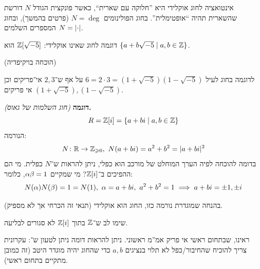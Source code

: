 \documentclass[name=רשימות אלגברה לינארית 2א]{../../../tex/classes/megasumPreamble}
\begin{document}
	אינטואציה לחוג אוקלידי היא ''חלוקה עם שארית``, כאשר פונקצית הגודל $N$ דורשת שהשארית תהיה ``אופטימלית''. בחוג הפולינומים $N = \deg$ (פרטים בהמשך), ובחוג המספרים השלמים $N = \left \lvert \cdot \right \rvert$. 
	
	דוגמה לחוג שאינו אוקלידי: $\mathbb{Z}[\sqrt{-5}]$ הוא $\{a + b\sqrt{-5} \mid a, b \in \mathbb{Z}\}$. 
	
	(הוכחה בויקיפדיה)
	
	לדוגמה בחוג לעיל $6 = 2 \cdot 3 = (1 + \sqrt{-5})(1 - \sqrt{-5})$ על אף ש־$2, 3$ אי־פריקים וכן $(1 + \sqrt{-5}), (1  - \sqrt{-5})$ אי פריקים. 
	
	
	\textbf{דוגמה }\textit{(חוג השלמות של גאוס)}\textbf{. }
	\[ R = \mathbb{Z}[i] = \{a + bi \mid a, b \in \mathbb{Z}\} \]
	הנורמה: 
	\[ N \colon \mathbb{R}\to \mathbb{Z}_{\geqslant 0}, \ N(a + bi) = a^2 + b^2 = |a + bi|^2 \]
	בדומה להוכחה לפיה הערך המוחלט של מורכב הוא כפלי, ניתן להראות ש־$N$ כפלית. מי הם ההפיכים ב־$\mathbb{Z}[i]$? מי שמקיים $\alpha \beta = 1$, כלומר: 
	\[ N(\alpha)N(\beta) = 1 = N(1), \ \alpha = a + bi, \ a^2 + b^2 = 1 \implies a + bi = \pm 1, \pm i \]
	
	בהנחה שמוגדרת נורמה כזו, החוג הוא אוקלידי (תנאי זה הכרחי אך לא מספיק). 
	
	
	
	שימו לב ש־$\mathbb{Z}$ בתוך $\mathbb{Z}[i]$ לא סגורים לבליעה. 
	
	ראינו, שבתחום ראשי אי פריק אמ''מ ראשוני. ניתן להראות דומה ניתן לטעון ש־: 
	עקרונית צריך להוכיח שהחיבור/כפל לא תלוי בנציגים $a, b$ כדי שהחוג יהיה מוגדר היטב (זה כמובן מתקיים בתחום ראשי). 
	
\end{document}
